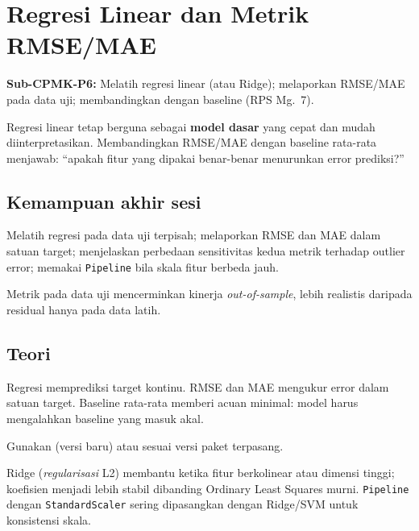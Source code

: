 \documentclass[../main.tex]{subfiles}
\begin{document}
\chapter{Regresi Linear dan Metrik RMSE/MAE}

\begin{subcpmk}
  \item \textbf{Sub-CPMK-P6:} Melatih regresi linear (atau Ridge); melaporkan RMSE/MAE pada data uji; membandingkan dengan baseline (RPS Mg.\ 7).
\end{subcpmk}


\noindent Regresi linear tetap berguna sebagai \textbf{model dasar} yang cepat dan mudah diinterpretasikan. Membandingkan RMSE/MAE dengan baseline rata-rata menjawab: ``apakah fitur yang dipakai benar-benar menurunkan error prediksi?''

\section{Kemampuan akhir sesi}

Melatih regresi pada data uji terpisah; melaporkan RMSE dan MAE dalam satuan target; menjelaskan perbedaan sensitivitas kedua metrik terhadap outlier error; memakai \texttt{Pipeline} bila skala fitur berbeda jauh.

Metrik pada data uji mencerminkan kinerja \textit{out-of-sample}, lebih realistis daripada residual hanya pada data latih.

\section{Teori}

\begin{konsep}
Regresi memprediksi target kontinu. RMSE dan MAE mengukur error dalam satuan target. Baseline rata-rata memberi acuan minimal: model harus mengalahkan baseline yang masuk akal.
\end{konsep}

\begin{catatan}
Gunakan  (versi baru) atau  sesuai versi paket terpasang.
\end{catatan}

Ridge (\textit{regularisasi} L2) membantu ketika fitur berkolinear atau dimensi tinggi; koefisien menjadi lebih stabil dibanding Ordinary Least Squares murni. \texttt{Pipeline} dengan \texttt{StandardScaler} sering dipasangkan dengan Ridge/SVM untuk konsistensi skala.
\end{document}
